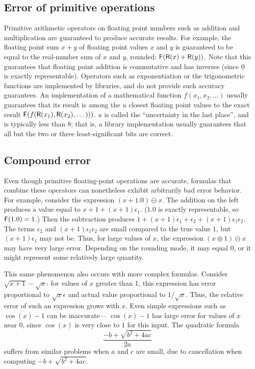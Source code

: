\documentclass[paper.tex]{subfiles}
\begin{document}
\subsection{Error of primitive operations}

Primitive arithmetic operators on floating point numbers such as
addition and multiplication are guaranteed to produce accurate
results.  For example, the floating point sum $x + y$ of floating
point values $x$ and $y$ is guaranteed to be equal to the real-number
sum of $x$ and $y$, rounded: $\mathsf{F}(\mathsf{R}(x) + \mathsf{R}(y))$.  Note that this
guarantees that floating point addition is commutative and has
inverses (since $0$ is exactly representable).  Operators such as
exponentiation or the trigonometric functions are implemented by
libraries, and do not provide such accuracy guarantees.  An
implementation of a mathematical function $f(x_1, x_2, \dotsc)$
usually guarantees that its result is among the $u$ closest floating
point values to the exact result $\mathsf{F}(f(\mathsf{R}(x_1), \mathsf{R}(x_2), \dotsc)))$.
$u$ is called the ``uncertainty in the last place'', and is typically
less than 8; that is, a library implementation usually guarantees that
all but the two or three least-significant bits are correct.

\subsection{Compound error}

Even though primitive floating-point operations are accurate, formulas
that combine these operators can nonetheless exhibit arbitrarily bad
error behavior.  For example, consider the expression $(x + 1.0)
\ominus x$.  The addition on the left produces a value equal to $x + 1
+ (x + 1)\epsilon_1$.  ($1.0$ is exactly representable, so $\mathsf{F}(1.0) =
1$.)  Then the subtraction produces $1 + (x + 1) \epsilon_1 +
\epsilon_2 + (x + 1) \epsilon_1 \epsilon_2$.  The terms $\epsilon_2$
and $(x+1)\epsilon_1\epsilon_2$ are small compared to the true value
$1$, but $(x + 1) \epsilon_1$ may not be.  Thus, for large values of
$x$, the expression $(x \oplus 1) \ominus x$ may have very large
error.  Depending on the rounding mode, it may equal $0$, or it might
represent some relatively large quantity.

This same phenomenon also occurs with more complex formulas.  Consider
$\sqrt{x + 1} - \sqrt{x}$: for values of $x$ greater than
1, this expression has error proportional to $\sqrt{x} \epsilon$ and
actual value proportional to $1 / \sqrt{x}$.  Thus, the relative
error of such an expression grows with $x$.  Even simple expressions
such as $\cos(x) - 1$ can be inaccurate---%
$\cos(x) - 1$ has large error for values of $x$ near 0, since
$\cos(x)$ is very close to $1$ for this input.  The quadratic
formula \[\frac{-b + \sqrt{b^2 + 4 a c}}{2 a}\] suffers from similar
problems when $a$ and $c$ are small, due to cancellation when
computing $-b + \sqrt{b^2 + 4 a c}$.
\end{document}
